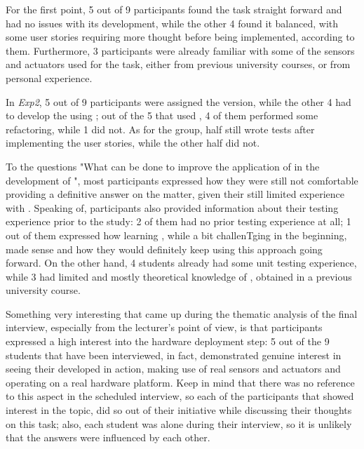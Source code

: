 For the first point, 5 out of 9 participants found the task straight forward and had no issues with its development, while the other 4 found it balanced, with some user stories requiring more thought before being implemented, according to them. Furthermore, 3 participants were already familiar with some of the sensors and actuators used for the task, either from previous university courses, or from personal experience.

In \textit{Exp2}, 5 out of 9 participants were assigned the \tdd version, while the other 4 had to develop the \es using \notdd; out of the 5 that used \tdd, 4 of them performed some refactoring, while 1 did not. As for the \notdd group, half still wrote tests after implementing the user stories, while the other half did not.

To the questions "What can be done to improve the application of \tdd in the development of \ess", most participants expressed how they were still not comfortable providing a definitive answer on the matter, given their still limited experience with \tdd.
Speaking of, participants also provided information about their testing experience prior to the study: 2 of them had no prior testing experience at all; 1 out of them expressed how learning \tdd, while a bit challenTging in the beginning, made sense and how they would definitely keep using this approach going forward. On the other hand, 4 students already had some unit testing experience, while 3 had limited and mostly theoretical knowledge of \tdd, obtained in a previous university course.

Something very interesting that came up during the thematic analysis of the final interview, especially from the lecturer's point of view, is that participants expressed a high interest into the hardware deployment step: 5 out of the 9 students that have been interviewed, in fact, demonstrated genuine interest in seeing their developed \es in action, making use of real sensors and actuators and operating on a real hardware platform. Keep in mind that there was no reference to this aspect in the scheduled interview, so each of the participants that showed interest in the topic, did so out of their initiative while discussing their thoughts on this task; also, each student was alone during their interview, so it is unlikely that the answers were influenced by each other.